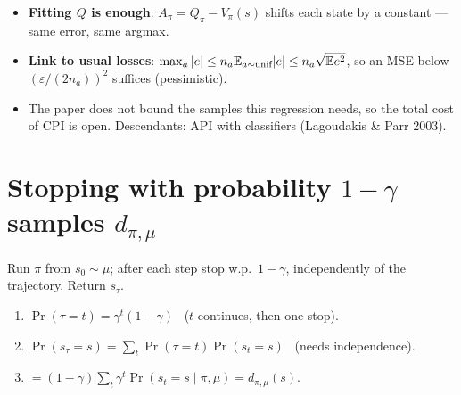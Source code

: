 \begin{itemize}
  \item \textbf{Fitting $Q$ is enough}: $A_\pi=Q_\pi-V_\pi(s)$ shifts each state by a constant --- same error, same argmax.
  \item \textbf{Link to usual losses}: $\max_a|e|\le n_a\mathbb{E}_{a\sim\text{unif}}|e|\le n_a\sqrt{\mathbb{E} e^2}$, so an MSE below $(\varepsilon/(2n_a))^2$ suffices (pessimistic).
  \item The paper does not bound the samples this regression needs, so the total cost of CPI is open. Descendants: API with classifiers (Lagoudakis \& Parr 2003).
\end{itemize}

\section{Stopping with probability $1-\gamma$ samples $d_{\pi,\mu}$}
\label{app:geom}

Run $\pi$ from $s_0\sim\mu$; after each step stop w.p.\ $1-\gamma$, independently of the trajectory. Return $s_\tau$.

\begin{minipage}[c]{0.52\linewidth}
\begin{enumerate}
  \item $\Pr(\tau=t)=\gamma^t(1-\gamma)$ \ ($t$ continues, then one stop).
  \item $\Pr(s_\tau=s)=\sum_t\Pr(\tau=t)\Pr(s_t=s)$ \ (needs independence).
  \item $=(1-\gamma)\sum_t\gamma^t\Pr(s_t=s\mid\pi,\mu)=d_{\pi,\mu}(s)$.
\end{enumerate}
\end{minipage}\hfill
\begin{minipage}[c]{0.45\linewidth}
\centering
{}
\end{minipage}

